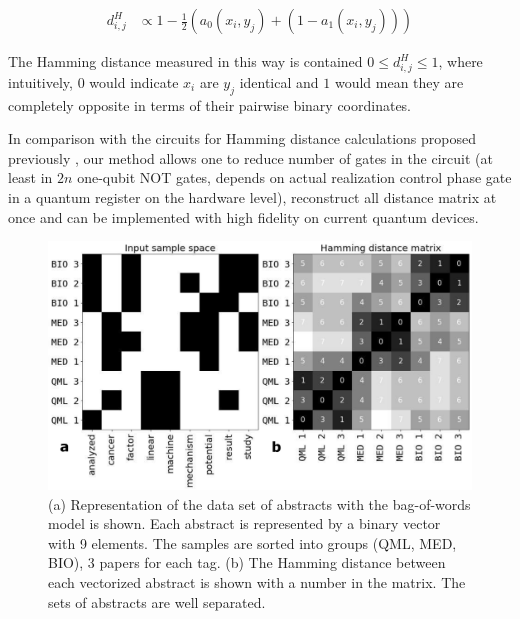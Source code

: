 \documentclass[pra,showkeys,twocolumn,showpacs]{revtex4-1}
\begin{document}
\begin{align}
    d_{i,j}^H & \propto 1 - \frac{1}{2}(a_0(x_i,y_j) + (1-a_1(x_i,y_j)))
\end{align}

The Hamming distance measured in this way is contained $0 \leq d_{i,j}^H \leq 1$, 
where intuitively, $0$ would indicate $x_i$ are $y_j$ identical and 
$1$ would mean they are completely opposite in terms of their pairwise binary coordinates.

In comparison with the circuits for Hamming distance calculations proposed previously \cite{trugenberger2001}, 
our method allows one to reduce number of gates in the circuit (at least in $2n$ one-qubit NOT gates, 
depends on actual realization control phase gate in a quantum register on the hardware level), 
reconstruct all distance matrix at once and can be implemented with high fidelity on current quantum devices.

\begin{figure}[t]
	\label{fig:vectorized_sample}
	\includegraphics[width=0.95\columnwidth]{vectorized_sample.png}
	\caption{
		(a) Representation of the data set of abstracts with the bag-of-words model is shown. 
		Each abstract is represented by a binary vector with 9 elements. 
		The samples are sorted into groups (QML, MED, BIO), 3 papers for each tag.  
		(b) The Hamming distance between each vectorized abstract is shown with a number in the matrix. 
		The sets of abstracts are well separated.
	} 
\end{figure}
\end{document}
